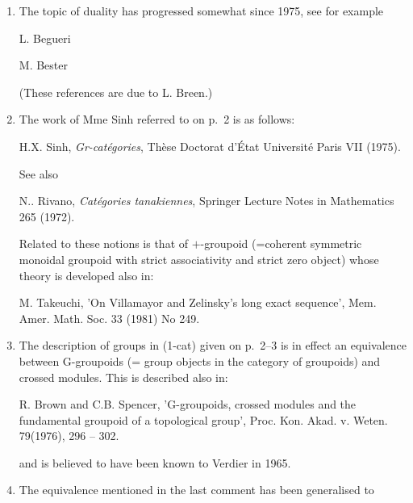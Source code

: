 \documentclass[11pt,a4paper]{article}
\begin{document}
\begin{enumerate}
  \item[1.] The topic of duality has progressed somewhat since 1975, see for example

  L. Begueri 

  M. Bester 

  (These references are due to L. Breen.)


  \item[2.] The work of Mme Sinh referred to on p.~2 is as follows:

  H.X. Sinh, \emph{Gr-catégories}, Thèse Doctorat d'État Université Paris VII (1975).

  See also

  N.\ill{}.  Rivano, \emph{Catégories tanakiennes}, Springer Lecture Notes in Mathematics 265 (1972).

  Related to these notions is that of $+$-groupoid (=coherent symmetric monoidal groupoid with strict associativity and strict zero object) whose theory is developed also in:

  M. Takeuchi, 'On Villamayor and Zelinsky's long exact sequence', Mem. Amer. Math. Soc. 33 (1981) No 249.

  \item[3.] The description of groups in (1-cat) given on p.~2--3 is in effect an equivalence between G-groupoids (= group objects in the category of groupoids) and crossed modules. This is described also in:

  R. Brown and C.B. Spencer, 'G-groupoids, crossed modules and the fundamental groupoid of a topological group', Proc. Kon. Akad. v. Weten. 79(1976), 296 -- 302.

  and is believed to have been known to Verdier in 1965.

  \item[4.] The equivalence mentioned in the last comment has been generalised to
\end{enumerate}
\end{document}
